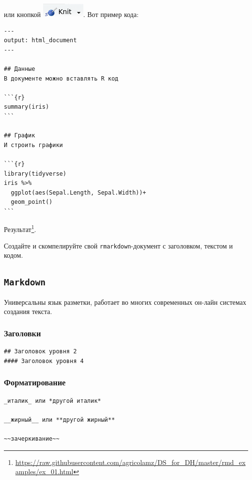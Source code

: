 \documentclass[
]{book}
\makeatletter
\renewcommand{\href}[2]{#2\footnote{\url{#1}}}
\newenvironment{kframe}{%
    \medskip{}
    \setlength{\fboxsep}{.8em}
    \def\at@end@of@kframe{}%
    \ifinner\ifhmode%
    \def\at@end@of@kframe{\end{minipage}}%
    \begin{minipage}{\columnwidth}%
    \fi\fi%
    \def\FrameCommand##1{\hskip\@totalleftmargin \hskip-\fboxsep
    \colorbox{shadecolor}{##1}\hskip-\fboxsep
        \hskip-\linewidth \hskip-\@totalleftmargin \hskip\columnwidth}%
    \MakeFramed {\advance\hsize-\width
      \@totalleftmargin\z@ \linewidth\hsize
      \@setminipage}}%
  {\par\unskip\endMakeFramed%
    \at@end@of@kframe}
\newenvironment{rmdblock}[1]
  {
    \begin{itemize}
    \renewcommand{\labelitemi}{
      \raisebox{-.7\height}[0pt][0pt]{
        {\setkeys{Gin}{width=3em,keepaspectratio}\texttt{[image: images/\#1]}}
        }
        }
        \setlength{\fboxsep}{1em}
        \begin{kframe}
        \item
      }
      {
        \end{kframe}
        \end{itemize}
      }
\newenvironment{rmdtask}
      {\begin{rmdblock}{task}}
      {\end{rmdblock}}
\makeatother
\begin{document}
или кнопкой \includegraphics{images/7.01_knit.png}. Вот пример кода:

\begin{verbatim}
---
output: html_document
---

## Данные
В документе можно вставлять R код

```{r}
summary(iris)
```

## График
И строить графики

```{r}
library(tidyverse)
iris %>% 
  ggplot(aes(Sepal.Length, Sepal.Width))+
  geom_point()
```
\end{verbatim}

\href{https://raw.githubusercontent.com/agricolamz/DS_for_DH/master/rmd_examples/ex_01.html}{Результат}.

\begin{rmdtask}
Создайте и скомпелируйте свой \texttt{rmarkdown}-документ с заголовком,
текстом и кодом.
\end{rmdtask}

\hypertarget{markdown}{%
\subsection{\texorpdfstring{\texttt{Markdown}}{Markdown}}\label{markdown}}

Универсальны язык разметки, работает во многих современных он-лайн системах создания текста.

\hypertarget{ux437ux430ux433ux43eux43bux43eux432ux43aux438}{%
\subsubsection{Заголовки}\label{ux437ux430ux433ux43eux43bux43eux432ux43aux438}}

\begin{verbatim}
## Заголовок уровня 2
#### Заголовок уровня 4
\end{verbatim}

\hypertarget{ux444ux43eux440ux43cux430ux442ux438ux440ux43eux432ux430ux43dux438ux435}{%
\subsubsection{Форматирование}\label{ux444ux43eux440ux43cux430ux442ux438ux440ux43eux432ux430ux43dux438ux435}}

\begin{verbatim}
_италик_ или *другой италик*

__жирный__ или **другой жирный**

~~зачеркивание~~
\end{verbatim}
\end{document}
